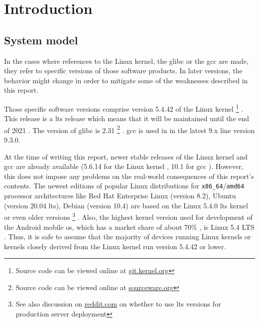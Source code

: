 \chapter{Introduction}
\label{chp:introduction}

\section{System model}
\label{sec:system-model}

In the cases where references to the Linux kernel, the \gls{glibc} or the \gls{gcc} are made, they refer to specific versions of those software products.
In later versions, the behavior might change in order to mitigate some of the weaknesses described in this report.

Those specific software versions comprise version 5.4.42 of the Linux kernel%
	\footnote{Source code can be viewed online at \href{https://git.kernel.org/stable/h/v5.4.42}{git.kernel.org}}%
.
This release is a \gls{lts} release which means that it will be maintained until the end of 2021 \cite{LKO2020}.
The version of \gls{glibc} is 2.31%
	\footnote{Source code can be viewed online at \href{https://sourceware.org/git/?p=glibc.git;a=tree;h=6ee690ef6fa36bf79d2e05b5a30a4f7e10ba3937;hb=9ea3686266dca3f004ba874745a4087a89682617}{sourceware.org}}%
.
\gls{gcc} is used in in the latest 9.x line version 9.3.0.

At the time of writing this report, newer stable releases of the Linux kernel and \gls{gcc} are already available (5.6.14 for the Linux kernel \cite{LKO2020a}, 10.1 for \gls{gcc} \cite{FSF2020}).
However, this does not impose any problems on the real-world consequences of this report's contents.
The newest editions of popular Linux distributions for \texttt{x86\_64}/\texttt{amd64} processor architectures like Red Hat Enterprise Linux (version 8.2), Ubuntu (version 20.04 \gls{lts}), Debian (version 10.4) are based on the Linux 5.4.0 \gls{lts} kernel or even older versions%
	\footnote{See also discussion on \href{https://www.reddit.com/r/webhosting/comments/beg0z0/should_i_use_an_lts_version_of_ubuntu_for_my_web/}{reddit.com} on whether to use \gls{lts} versions for production server deployment}
\cite{RedHat2020,Canonical2020,SPI2020,SPI2020a}.
Also, the highest kernel version used for development of the Android mobile \gls{os}, which has a market share of about 70\% \cite{Statcounter2020}, is Linux 5.4 LTS \cite{GoogleLLC2020}.
Thus, it is safe to assume that the majority of devices running Linux kernels or kernels closely derived from the Linux kernel run version 5.4.42 or lower.

